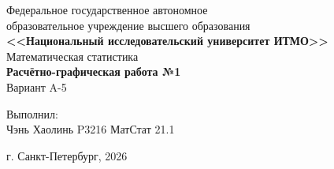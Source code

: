 \begin{titlepage}
    \centering
    Федеральное государственное автономное \\
    образовательное учреждение высшего образования \\
    \textbf{<<Национальный исследовательский университет ИТМО>>} \\

    \vfill
    Математическая статистика \\
    \vspace{0.5\baselineskip}
    \textbf{Расчётно-графическая работа №1} \\
    \vspace{0.5\baselineskip}
    Вариант A-5 \\

    \vfill

    \flushright
    Выполнил:\\ 
    Чэнь Хаолинь P3216 МатСтат 21.1\\

    \vspace{4\baselineskip}
    
    \centering
    г. Санкт-Петербург, 2026

\end{titlepage}